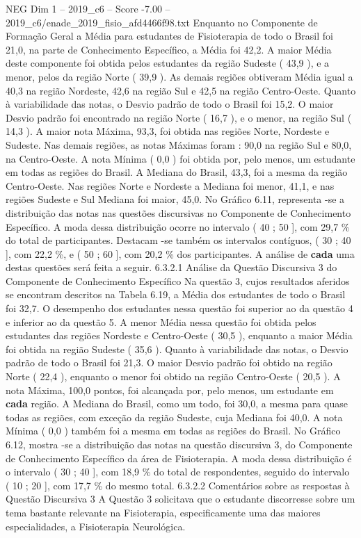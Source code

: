 \begin{textsample}{NEG Dim 1 – 2019\_c6 – Score -7.00 – 2019\_c6/enade\_2019\_fisio\_afd4466f98.txt}
Enquanto no Componente de Formação Geral a Média para estudantes de Fisioterapia de todo o Brasil foi 21,0, na parte de Conhecimento Específico, a Média foi 42,2.
A maior Média deste componente foi obtida pelos estudantes da região Sudeste ( 43,9 ), e a menor, pelos da região Norte ( 39,9 ).
As demais regiões obtiveram Média igual a 40,3 na região Nordeste, 42,6 na região Sul e 42,5 na região Centro-Oeste.
Quanto à variabilidade das notas, o Desvio padrão de todo o Brasil foi 15,2.
O maior Desvio padrão foi encontrado na região Norte ( 16,7 ), e o menor, na região Sul ( 14,3 ).
A maior nota Máxima, 93,3, foi obtida nas regiões Norte, Nordeste e Sudeste.
Nas demais regiões, as notas Máximas foram : 90,0 na região Sul e 80,0, na Centro-Oeste.
A nota Mínima ( 0,0 ) foi obtida por, pelo menos, um estudante em todas as regiões do Brasil.
A Mediana do Brasil, 43,3, foi a mesma da região Centro-Oeste.
Nas regiões Norte e Nordeste a Mediana foi menor, 41,1, e nas regiões Sudeste e Sul Mediana foi maior, 45,0.
No Gráfico 6.11, representa -se a distribuição das notas nas questões discursivas no Componente de Conhecimento Específico.
A moda dessa distribuição ocorre no intervalo ( 40 ; 50 ], com 29,7 \% do total de participantes.
Destacam -se também os intervalos contíguos, ( 30 ; 40 ], com 22,2 \%, e ( 50 ; 60 ], com 20,2 \% dos participantes.
A análise de \textbf{cada} uma destas questões será feita a seguir. 6.3.2.1 Análise da Questão Discursiva 3 do Componente de Conhecimento Específico Na questão 3, cujos resultados aferidos se encontram descritos na Tabela 6.19, a Média dos estudantes de todo o Brasil foi 32,7.
O desempenho dos estudantes nessa questão foi superior ao da questão 4 e inferior ao da questão 5.
A menor Média nessa questão foi obtida pelos estudantes das regiões Nordeste e Centro-Oeste ( 30,5 ), enquanto a maior Média foi obtida na região Sudeste ( 35,6 ).
Quanto à variabilidade das notas, o Desvio padrão de todo o Brasil foi 21,3.
O maior Desvio padrão foi obtido na região Norte ( 22,4 ), enquanto o menor foi obtido na região Centro-Oeste ( 20,5 ).
A nota Máxima, 100,0 pontos, foi alcançada por, pelo menos, um estudante em \textbf{cada} região.
A Mediana do Brasil, como um todo, foi 30,0, a mesma para quase todas as regiões, com exceção da região Sudeste, cuja Mediana foi 40,0.
A nota Mínima ( 0,0 ) também foi a mesma em todas as regiões do Brasil.
No Gráfico 6.12, mostra -se a distribuição das notas na questão discursiva 3, do Componente de Conhecimento Específico da área de Fisioterapia.
A moda dessa distribuição é o intervalo ( 30 ; 40 ], com 18,9 \% do total de respondentes, seguido do intervalo ( 10 ; 20 ], com 17,7 \% do mesmo total. 6.3.2.2 Comentários sobre as respostas à Questão Discursiva 3 A Questão 3 solicitava que o estudante discorresse sobre um tema bastante relevante na Fisioterapia, especificamente uma das maiores especialidades, a Fisioterapia Neurológica.

\end{textsample}
